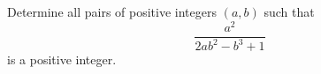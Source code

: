 Determine all pairs of positive integers $(a,b)$ such that
\[ \frac{a^2}{2ab^2-b^3+1} \]
is a positive integer.